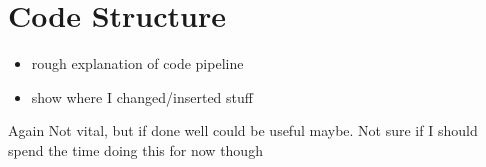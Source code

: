 \section{Code Structure}
\begin{itemize}
    \item rough explanation of code pipeline
    \item show where I changed/inserted stuff
\end{itemize}
\color{red}
Again Not vital, but if done well could be useful maybe. Not sure if I should spend the time doing this for now though
\color{black}
  
